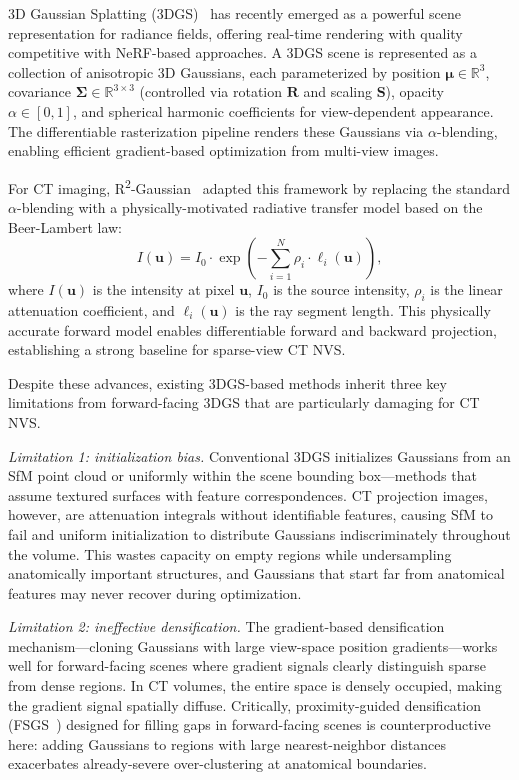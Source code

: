 \documentclass{egPublStyle}
\newcommand{\rtwo}{R\textsuperscript{2}-Gaussian}
\begin{document}
3D Gaussian Splatting (3DGS)~\cite{kerbl20233d} has recently emerged as a powerful scene representation for radiance fields, offering real-time rendering with quality competitive with NeRF-based approaches. A 3DGS scene is represented as a collection of anisotropic 3D Gaussians, each parameterized by position $\boldsymbol{\mu} \in \mathbb{R}^3$, covariance $\boldsymbol{\Sigma} \in \mathbb{R}^{3\times3}$ (controlled via rotation $\mathbf{R}$ and scaling $\mathbf{S}$), opacity $\alpha \in [0,1]$, and spherical harmonic coefficients for view-dependent appearance. The differentiable rasterization pipeline renders these Gaussians via $\alpha$-blending, enabling efficient gradient-based optimization from multi-view images.

For CT imaging, \rtwo~\cite{hu2024r2} adapted this framework by replacing the standard $\alpha$-blending with a physically-motivated radiative transfer model based on the Beer-Lambert law:
\begin{equation}
I(\mathbf{u}) = I_0 \cdot \exp\left(-\sum_{i=1}^{N} \rho_i \cdot \ell_i(\mathbf{u})\right),
\label{eq:beer_lambert}
\end{equation}
where $I(\mathbf{u})$ is the intensity at pixel $\mathbf{u}$, $I_0$ is the source intensity, $\rho_i$ is the linear attenuation coefficient, and $\ell_i(\mathbf{u})$ is the ray segment length. This physically accurate forward model enables differentiable forward and backward projection, establishing a strong baseline for sparse-view CT NVS.

Despite these advances, existing 3DGS-based methods inherit three key limitations from forward-facing 3DGS that are particularly damaging for CT NVS.

\textit{Limitation 1: initialization bias.} Conventional 3DGS initializes Gaussians from an SfM point cloud or uniformly within the scene bounding box---methods that assume textured surfaces with feature correspondences. CT projection images, however, are attenuation integrals without identifiable features, causing SfM to fail and uniform initialization to distribute Gaussians indiscriminately throughout the volume. This wastes capacity on empty regions while undersampling anatomically important structures, and Gaussians that start far from anatomical features may never recover during optimization.

\textit{Limitation 2: ineffective densification.} The gradient-based densification mechanism---cloning Gaussians with large view-space position gradients---works well for forward-facing scenes where gradient signals clearly distinguish sparse from dense regions. In CT volumes, the entire space is densely occupied, making the gradient signal spatially diffuse. Critically, proximity-guided densification (FSGS~\cite{zhu2024fsgs}) designed for filling gaps in forward-facing scenes is counterproductive here: adding Gaussians to regions with large nearest-neighbor distances exacerbates already-severe over-clustering at anatomical boundaries.
\end{document}
